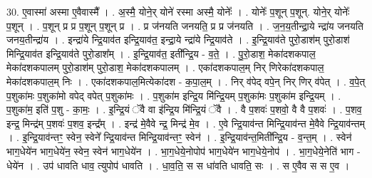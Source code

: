 \documentclass[17pt]{extarticle}
\begin{document}
30. ए॒वास्मा॑ अस्मा ए॒वैवास्मै᳚ । . अ॒स्मै॒ योने॒र् योने॑ रस्मा अस्मै॒ योनेः᳚ । . योनेः᳚ प॒शून् प॒शून्. योने॒र् योनेः᳚ प॒शून् । . प॒शून् प्र प्र प॒शून् प॒शून् प्र । . प्र ज॑नयति जनयति॒ प्र प्र ज॑नयति । . ज॒न॒य॒तीन्द्रा॒ये न्द्रा॑य जनयति जनय॒तीन्द्रा॑य । . इन्द्रा॑ये न्द्रि॒याव॑त इन्द्रि॒याव॑त॒ इन्द्रा॒ये न्द्रा॑ये न्द्रि॒याव॑ते । . इ॒न्द्रि॒याव॑ते पुरो॒डाश॑म् पुरो॒डाश॑ मिन्द्रि॒याव॑त इन्द्रि॒याव॑ते पुरो॒डाश᳚म् । . इ॒न्द्रि॒याव॑त॒ इती᳚न्द्रि॒य - व॒ते॒ । . पु॒रो॒डाश॒ मेका॑दशकपाल॒ मेका॑दशकपालम् पुरो॒डाश॑म् पुरो॒डाश॒ मेका॑दशकपालम् । . एका॑दशकपाल॒म् निर् णिरेका॑दशकपाल॒ मेका॑दशकपाल॒म् निः । . एका॑दशकपाल॒मित्येका॑दश - क॒पा॒ल॒म् । . निर् व॑पेद् वपे॒न् निर् णिर् व॑पेत् । . व॒पे॒त् प॒शुका॑मः प॒शुका॑मो वपेद् वपेत् प॒शुका॑मः । . प॒शुका॑म इन्द्रि॒य मि॑न्द्रि॒यम् प॒शुका॑मः प॒शुका॑म इन्द्रि॒यम् । . प॒शुका॑म॒ इति॑ प॒शु - का॒मः॒ । . इ॒न्द्रि॒यं ॅवै वा इ॑न्द्रि॒य मि॑न्द्रि॒यं ॅवै । . वै प॒शवः॑ प॒शवो॒ वै वै प॒शवः॑ । . प॒शव॒ इन्द्र॒ मिन्द्र॑म् प॒शवः॑ प॒शव॒ इन्द्र᳚म् । . इन्द्र॑ मे॒वैवे न्द्र॒ मिन्द्र॑ मे॒व । . ए॒वे न्द्रि॒याव॑न्त मिन्द्रि॒याव॑न्त मे॒वैवे न्द्रि॒याव॑न्तम् । . इ॒न्द्रि॒याव॑न्तꣳ॒॒ स्वेन॒ स्वेने᳚ न्द्रि॒याव॑न्त मिन्द्रि॒याव॑न्तꣳ॒॒ स्वेन॑ । . इ॒न्द्रि॒याव॑न्त॒मिती᳚न्द्रि॒य - व॒न्त॒म् । . स्वेन॑ भाग॒धेये॑न भाग॒धेये॑न॒ स्वेन॒ स्वेन॑ भाग॒धेये॑न । . भा॒ग॒धेये॒नोपोप॑ भाग॒धेये॑न भाग॒धेये॒नोप॑ । . भा॒ग॒धेये॒नेति॑ भाग - धेये॑न । . उप॑ धावति धाव॒ त्युपोप॑ धावति । . धा॒व॒ति॒ स स धा॑वति धावति॒ सः । . स ए॒वैव स स ए॒व । \newline
\end{document}
